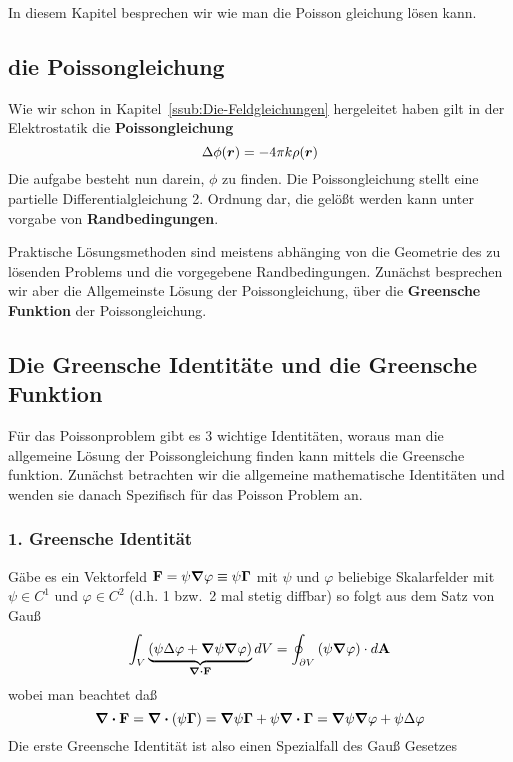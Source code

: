 In diesem Kapitel besprechen wir wie man die Poisson gleichung lösen kann.

\subsection{die Poissongleichung}%
\label{ssub:poissongleichung}

Wie wir schon in Kapitel~\ref{ssub:Die-Feldgleichungen} hergeleitet haben
gilt in der Elektrostatik die \textbf{Poissongleichung}
\begin{equation*}
  \Delta \phi (\vb*r) = -4\pi k \rho(\vb*r)
\end{equation*}
Die aufgabe besteht nun darein, $\phi$ zu finden. Die Poissongleichung 
stellt eine partielle Differentialgleichung 2. Ordnung dar, die gelößt
werden kann unter vorgabe von \textbf{Randbedingungen}.

Praktische Lösungsmethoden sind meistens abhänging von die Geometrie
des zu lösenden Problems und die vorgegebene Randbedingungen. 
Zunächst besprechen wir aber die Allgemeinste 
Lösung der Poissongleichung, über die \textbf{Greensche Funktion} der Poissongleichung.

\subsection{Die Greensche Identitäte und die Greensche Funktion}%
\label{sub:green}

Für das Poissonproblem gibt es 3 wichtige Identitäten, 
woraus man die allgemeine Lösung der Poissongleichung finden kann 
mittels die Greensche funktion. Zunächst betrachten wir die allgemeine
mathematische Identitäten und wenden sie danach Spezifisch für das Poisson
Problem an.

\subsubsection{1. Greensche Identität}%
\label{ssub:green-id-1}
Gäbe es ein Vektorfeld $\vb F = \psi \grad \varphi \equiv \psi \vb \Gamma$ 
mit $\psi$ und $\varphi$ beliebige Skalarfelder mit $\psi\in C^1$ und
$\varphi\in C^2$ (d.h. 1 bzw.\ 2 mal stetig diffbar) so folgt aus dem 
Satz von Gauß
\begin{equation}
  \int_V \underbrace{\qty(\psi\Delta\varphi + 
  \grad\psi\grad\varphi)}_{\div\vb F}dV =
  \oint_{\partial V} \qty(\psi\grad\varphi) \cdot d\vb A
\end{equation}
wobei man beachtet daß
\begin{equation*}
  \div \vb F =\div (\psi \vb \Gamma) = 
  \grad \psi \vb \Gamma + \psi\div\vb \Gamma = \grad \psi \grad \varphi + 
  \psi \Delta \varphi
\end{equation*}
Die erste Greensche Identität ist also einen Spezialfall des Gauß Gesetzes

